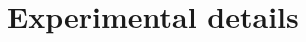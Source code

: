 \documentclass{article}
\newcommand{\TODO}[1]{\textcolor{red}{\textbf{TODO: #1}}}
\newcommand{\embed}{\emph{ours}}
\newcommand{\embedfn}{e}
\newcommand{\idfn}{id}
\begin{document}

\section{Experimental details}
\label{appendix-exp}

\end{document}
